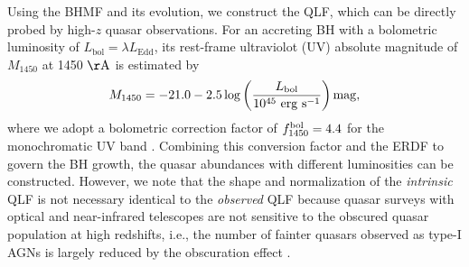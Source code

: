\documentclass[twocolumn, twocolappendix]{aastex63}
\newcommand{\Muv}{M_{1450}}
\newcommand{\Lbol}{L_\mathrm{bol}}
\begin{document}
\begin{CJK*}{UTF8}{gbsn}
Using the BHMF and its evolution, we construct the QLF, which can be directly probed by high-$z$ quasar observations.
For an accreting BH with a bolometric luminosity of $\Lbol=\lambda L_\mathrm{Edd}$, 
its rest-frame ultraviolot (UV) absolute magnitude of $\Muv$ at 1450 $\mathrm{\AA}$ is estimated by
\begin{equation}
  \label{eq:M1450}
  \Muv= -21.0-2.5 \log  \left(\frac{\Lbol}{10^{45}~\mathrm{erg~s}^{-1}} \right) \rm{mag},
\end{equation}
%
where we adopt a bolometric correction factor of $f^{\rm bol}_{1450}=4.4$ for the monochromatic UV band 
\citep{2006ApJS..166..470R}.
Combining this conversion factor and the ERDF to govern the BH growth, the quasar abundances with different luminosities 
can be constructed.
However, we note that the shape and normalization of the {\it intrinsic} QLF is not necessary identical to the {\it observed} QLF
because quasar surveys with optical and near-infrared telescopes are not sensitive to the obscured quasar population at high redshifts,
i.e., the number of fainter quasars observed as type-I AGNs is largely reduced by the obscuration effect
\citep{2003ApJ...598..886U,2007A&A...463...79G,2008A&A...490..905H,2014ApJ...786..104U,2014MNRAS.437.3550M}. 



\end{CJK*}
\end{document}
